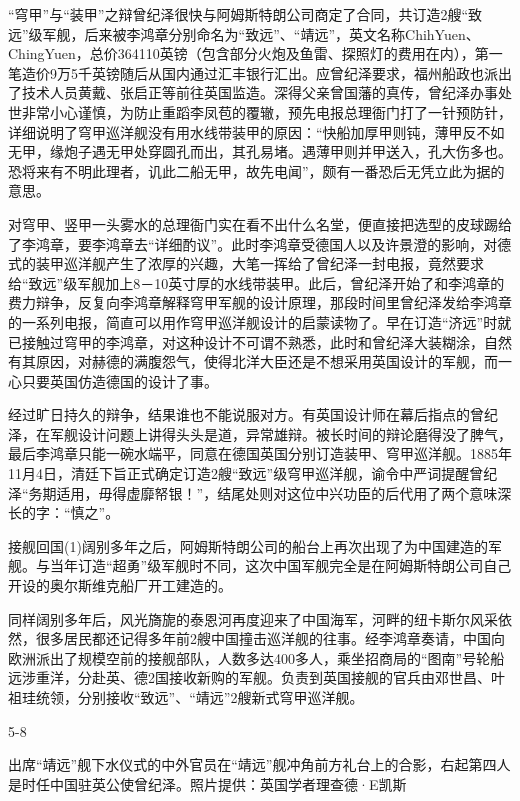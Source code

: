 \documentclass[12pt,UTF8]{ctexbook}
\begin{document}
“穹甲”与“装甲”之辩曾纪泽很快与阿姆斯特朗公司商定了合同，共订造2艘“致远”级军舰，后来被李鸿章分别命名为“致远”、“靖远”，英文名称ChihYuen、ChingYuen，总价364110英镑（包含部分火炮及鱼雷、探照灯的费用在内），第一笔造价9万5千英镑随后从国内通过汇丰银行汇出。应曾纪泽要求，福州船政也派出了技术人员黄戴、张启正等前往英国监造。深得父亲曾国藩的真传，曾纪泽办事处世非常小心谨慎，为防止重蹈李凤苞的覆辙，预先电报总理衙门打了一针预防针，详细说明了穹甲巡洋舰没有用水线带装甲的原因：“快船加厚甲则钝，薄甲反不如无甲，缘炮子遇无甲处穿圆孔而出，其孔易堵。遇薄甲则并甲送入，孔大伤多也。恐将来有不明此理者，讥此二船无甲，故先电闻”，颇有一番恐后无凭立此为据的意思。

对穹甲、竖甲一头雾水的总理衙门实在看不出什么名堂，便直接把选型的皮球踢给了李鸿章，要李鸿章去“详细酌议”。此时李鸿章受德国人以及许景澄的影响，对德式的装甲巡洋舰产生了浓厚的兴趣，大笔一挥给了曾纪泽一封电报，竟然要求给“致远”级军舰加上8－10英寸厚的水线带装甲。此后，曾纪泽开始了和李鸿章的费力辩争，反复向李鸿章解释穹甲军舰的设计原理，那段时间里曾纪泽发给李鸿章的一系列电报，简直可以用作穹甲巡洋舰设计的启蒙读物了。早在订造“济远”时就已接触过穹甲的李鸿章，对这种设计不可谓不熟悉，此时和曾纪泽大装糊涂，自然有其原因，对赫德的满腹怨气，使得北洋大臣还是不想采用英国设计的军舰，而一心只要英国仿造德国的设计了事。

经过旷日持久的辩争，结果谁也不能说服对方。有英国设计师在幕后指点的曾纪泽，在军舰设计问题上讲得头头是道，异常雄辩。被长时间的辩论磨得没了脾气，最后李鸿章只能一碗水端平，同意在德国英国分别订造装甲、穹甲巡洋舰。1885年11月4日，清廷下旨正式确定订造2艘“致远”级穹甲巡洋舰，谕令中严词提醒曾纪泽“务期适用，毋得虚靡帑银！”，结尾处则对这位中兴功臣的后代用了两个意味深长的字：“慎之”。

接舰回国(1)阔别多年之后，阿姆斯特朗公司的船台上再次出现了为中国建造的军舰。与当年订造“超勇”级军舰时不同，这次中国军舰完全是在阿姆斯特朗公司自己开设的奥尔斯维克船厂开工建造的。

同样阔别多年后，风光旖旎的泰恩河再度迎来了中国海军，河畔的纽卡斯尔风采依然，很多居民都还记得多年前2艘中国撞击巡洋舰的往事。经李鸿章奏请，中国向欧洲派出了规模空前的接舰部队，人数多达400多人，乘坐招商局的“图南”号轮船远涉重洋，分赴英、德2国接收新购的军舰。负责到英国接舰的官兵由邓世昌、叶祖珪统领，分别接收“致远”、“靖远”2艘新式穹甲巡洋舰。

5-8

出席“靖远”舰下水仪式的中外官员在“靖远”舰冲角前方礼台上的合影，右起第四人是时任中国驻英公使曾纪泽。照片提供：英国学者理查德·E凯斯
\end{document}
